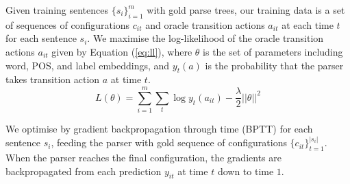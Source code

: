 Given training sentences ${\{s_{i}\}}_{i=1}^{m}$ with gold parse trees,
our training data is a set of sequences of configurations $c_{it}$ and oracle transition actions $a_{it}$ at each time $t$ for each sentence $s_{i}$.
We maximise the log-likelihood of the oracle transition actions $a_{it}$ given by Equation (\ref{eq:ll}),
where $\theta$ is the set of parameters including word, POS, and label embeddings,
and $y_{t}(a)$ is the probability that the parser takes transition action $a$ at time $t$.
\vspace{-1em}
\begin{equation}
  L(\theta) = \sum_{i=1}^{m} \sum_{t} \log y_{t}(a_{it})
  - \frac{\lambda}{2} ||\theta||^2
  \label{eq:ll}
\end{equation}

\vspace{-1em}
We optimise by gradient backpropagation through time (BPTT) for each sentence $s_{i}$, feeding the parser with gold sequence of configurations $\{c_{it}\}_{t=1}^{|s_{i}|}$. 
When the parser reaches the final configuration, the gradients are backpropagated
from each prediction ${y_{it}}$ at time $t$ down to time $1$.